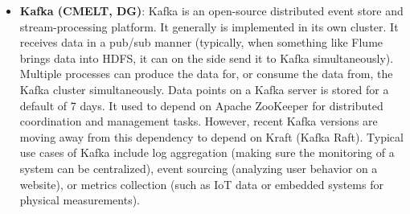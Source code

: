 \documentclass{article}
\begin{document}
\begin{itemize}
    \item \textbf{Kafka (CMELT, DG)}: Kafka is an open-source distributed event store and stream-processing platform. It generally is implemented in its own cluster. It receives data in a pub/sub manner (typically, when something like Flume brings data into HDFS, it can on the side send it to Kafka simultaneously). Multiple processes can produce the data for, or consume the data from, the Kafka cluster simultaneously. Data points on a Kafka server is stored for a default of 7 days. It used to depend on Apache ZooKeeper for distributed coordination and management tasks. However, recent Kafka versions are moving away from this dependency to depend on Kraft (Kafka Raft). Typical use cases of Kafka include log aggregation (making sure the monitoring of a system can be centralized), event sourcing (analyzing user behavior on a website), or metrics collection (such as IoT data or embedded systems for physical measurements).


\end{itemize}
\end{document}
